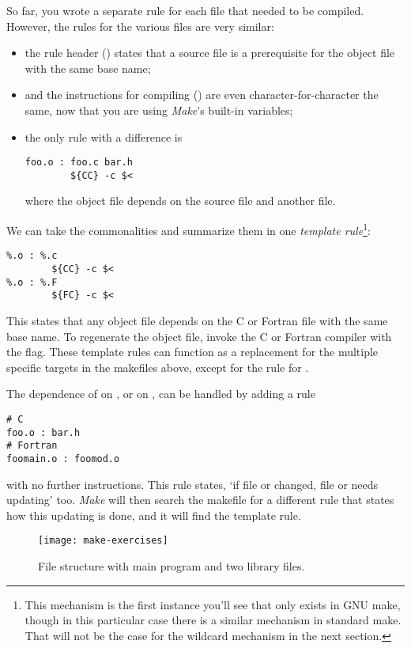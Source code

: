 So far, you wrote a separate rule for each file that
needed to be compiled. However, the rules for the various 
files are very similar:
\begin{itemize}
\item the rule header () states that a source file is a
  prerequisite for the object file with the same base name;
\item and the instructions for compiling () 
  are even character-for-character the
  same, now that you are using \emph{Make}'s built-in variables;
\item the only rule with a difference is 
\begin{lstlisting}
foo.o : foo.c bar.h
        ${CC} -c $<
\end{lstlisting}
  where the object file depends on the source file and another file.
\end{itemize}
We can take the commonalities and summarize them in one 
\emph{template rule}\footnote
{This mechanism is the first instance you'll see that only exists in
  GNU make, though in this particular case there is a similar
  mechanism in standard make. That will not be the case for the
  wildcard mechanism in the next section.}:
\begin{lstlisting}
%.o : %.c
        ${CC} -c $<
%.o : %.F
        ${FC} -c $<
\end{lstlisting}
This states that any object file depends on the C or Fortran file with
the same base name. To regenerate the object file, invoke the C or
Fortran compiler with the  flag.
These template rules can function as a replacement for the multiple
specific targets in the makefiles above, except for the rule for .

The dependence of  on , or  on
, can be handled by adding a rule
\begin{lstlisting}
# C
foo.o : bar.h
# Fortran
foomain.o : foomod.o
\end{lstlisting}
with no further instructions. This rule states, `if file
 or  changed, file  or 
needs updating' too. \emph{Make} will
then search the makefile for a different
rule that states how this updating is done, and it will find the
template rule.


\begin{figure}[ht]
  \texttt{[image: make-exercises]}
  \caption{File structure with main program and two library files.}
  \label{fig:make-exercises}
\end{figure}

